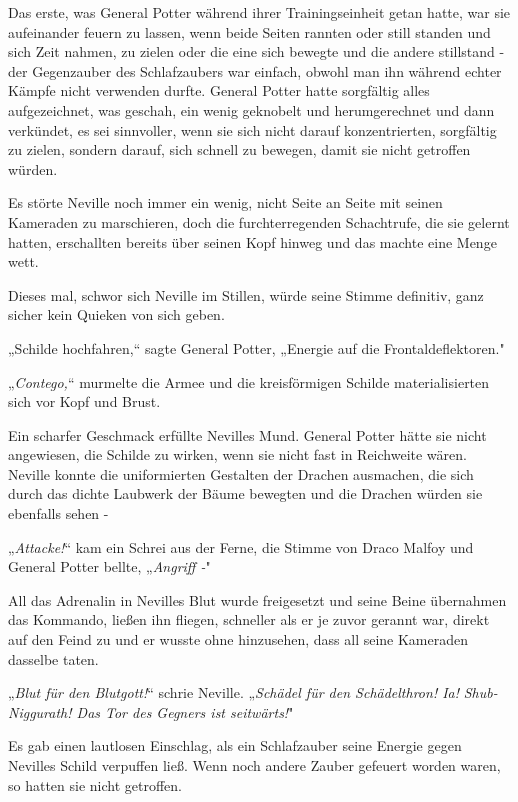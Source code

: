 {Das erste, was General Potter während ihrer Trainingseinheit getan hatte, war sie aufeinander feuern zu lassen, wenn beide Seiten rannten oder still standen und sich Zeit nahmen, zu zielen oder die eine sich bewegte und die andere stillstand - der Gegenzauber des Schlafzaubers war einfach, obwohl man ihn während echter Kämpfe nicht verwenden durfte. General Potter hatte sorgfältig alles aufgezeichnet, was geschah, ein wenig geknobelt und herumgerechnet und dann verkündet, es sei sinnvoller, wenn sie sich nicht darauf konzentrierten, sorgfältig zu zielen, sondern darauf, sich schnell zu bewegen, damit sie nicht getroffen würden.

Es störte Neville noch immer ein wenig, nicht Seite an Seite mit seinen Kameraden zu marschieren, doch die furchterregenden Schachtrufe, die sie gelernt hatten, erschallten bereits über seinen Kopf hinweg und das machte eine Menge wett.

Dieses mal, schwor sich Neville im Stillen, würde seine Stimme definitiv, ganz sicher kein Quieken von sich geben.

„Schilde hochfahren,“ sagte General Potter, „Energie auf die Frontaldeflektoren."

„\emph{Contego,}“ murmelte die Armee und die kreisförmigen Schilde materialisierten sich vor Kopf und Brust.

Ein scharfer Geschmack erfüllte Nevilles Mund. General Potter hätte sie nicht angewiesen, die Schilde zu wirken, wenn sie nicht fast in Reichweite wären. Neville konnte die uniformierten Gestalten der Drachen ausmachen, die sich durch das dichte Laubwerk der Bäume bewegten und die Drachen würden sie ebenfalls sehen -

„\emph{Attacke!}“ kam ein Schrei aus der Ferne, die Stimme von Draco Malfoy und General Potter bellte, „\emph{Angriff -}"

All das Adrenalin in Nevilles Blut wurde freigesetzt und seine Beine übernahmen das Kommando, ließen ihn fliegen, schneller als er je zuvor gerannt war, direkt auf den Feind zu und er wusste ohne hinzusehen, dass all seine Kameraden dasselbe taten.

„\emph{Blut für den Blutgott!}“ schrie Neville. „\emph{Schädel für den Schädelthron! Ia!} \emph{Shub-Niggurath! Das Tor des Gegners ist seitwärts!}"

Es gab einen lautlosen Einschlag, als ein Schlafzauber seine Energie gegen Nevilles Schild verpuffen ließ. Wenn noch andere Zauber gefeuert worden waren, so hatten sie nicht getroffen.

}
